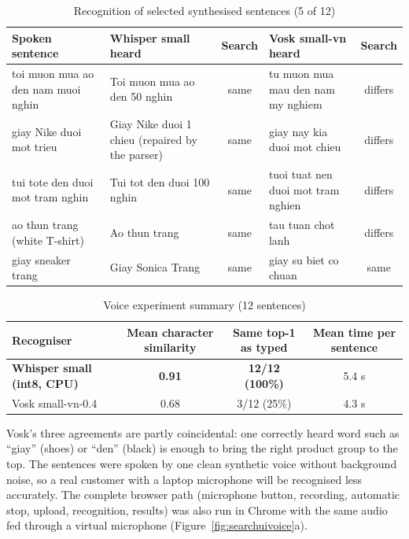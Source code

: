 \begin{table}[H]
\centering
\small
\caption{Recognition of selected synthesised sentences (5 of 12)}
\label{tab:voicerows}
\begin{tabular}{@{}p{3.9cm} p{3.6cm} c p{3.6cm} c@{}}
\toprule
\textbf{Spoken sentence} & \textbf{Whisper small heard} & \textbf{Search} & \textbf{Vosk small-vn heard} & \textbf{Search} \\ \midrule
toi muon mua ao den nam muoi nghin & Toi muon mua ao den 50 nghin & same & tu muon mua mau den nam my nghiem & differs \\
giay Nike duoi mot trieu & Giay Nike duoi 1 chieu (repaired by the parser) & same & giay nay kia duoi mot chieu & differs \\
tui tote den duoi mot tram nghin & Tui tot den duoi 100 nghin & same & tuoi tuat nen duoi mot tram nghien & differs \\
ao thun trang (white T-shirt) & Ao thun trang & same & tau tuan chot lanh & differs \\
giay sneaker trang & Giay Sonica Trang & same & giay su biet co chuan & same \\ \bottomrule
\end{tabular}
\end{table}

\begin{table}[H]
\centering
\small
\caption{Voice experiment summary (12 sentences)}
\label{tab:voicesum}
\begin{tabular}{@{}lccc@{}}
\toprule
\textbf{Recogniser} & \textbf{Mean character similarity} & \textbf{Same top-1 as typed} & \textbf{Mean time per sentence} \\ \midrule
\textbf{Whisper small (int8, CPU)} & \textbf{0.91} & \textbf{12/12 (100\%)} & 5.4 s \\
Vosk small-vn-0.4 & 0.68 & 3/12 (25\%) & 4.3 s \\ \bottomrule
\end{tabular}
\end{table}

Vosk's three agreements are partly coincidental: one correctly heard word such as ``giay'' (shoes) or ``den'' (black) is enough to bring the right product group to the top. The sentences were spoken by one clean synthetic voice without background noise, so a real customer with a laptop microphone will be recognised less accurately. The complete browser path (microphone button, recording, automatic stop, upload, recognition, results) was also run in Chrome with the same audio fed through a virtual microphone (Figure~\ref{fig:searchuivoice}a).

